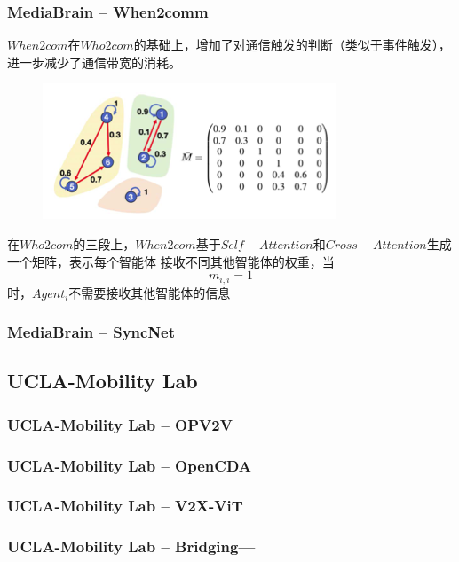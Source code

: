 \documentclass[8]{beamer}
\begin{document}
\begin{frame}
    \frametitle{MediaBrain -- When2comm\cite{liu2020when2com}}
        $When2com$在$Who2com$的基础上，增加了对通信触发的判断（类似于事件触发），进一步减少了通信带宽的消耗。\\
    
    \begin{figure}
        \includegraphics[width=0.5\linewidth]{pic/When2com.png}
    \end{figure}

    在$Who2com$的三段上，$When2com$基于$Self-Attention$和$Cross-Attention$生成一个矩阵，表示每个智能体
    接收不同其他智能体的权重，当
    $$ m_{i, i} = 1 $$
    时，$Agent_i$不需要接收其他智能体的信息

\end{frame}

\begin{frame}
    \frametitle{MediaBrain -- SyncNet}

    

\end{frame}

\subsection{UCLA-Mobility Lab}
\begin{frame}
    \frametitle{UCLA-Mobility Lab -- OPV2V}

    

\end{frame}

\begin{frame}
    \frametitle{UCLA-Mobility Lab -- OpenCDA}

    

\end{frame}

\begin{frame}
    \frametitle{UCLA-Mobility Lab -- V2X-ViT}

    

\end{frame}

\begin{frame}
    \frametitle{UCLA-Mobility Lab -- Bridging---}

    

\end{frame}
\end{document}
